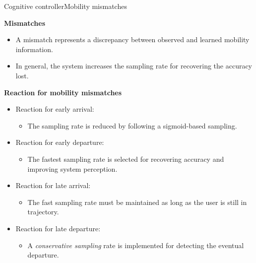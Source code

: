 \begin{frame}{Cognitive controller}{Mobility mismatches}
\small
\begin{block}{\small \textbf{Mismatches}}
  \begin{itemize}
    \item A mismatch represents a discrepancy between observed and learned mobility information.
    \item In general, the system increases the sampling rate for recovering the accuracy lost.
  \end{itemize}
\end{block}

\begin{block}{\small \textbf{Reaction for mobility mismatches}}
\begin{itemize}
  \item Reaction for early arrival:
  \begin{itemize}
    \item The sampling rate is reduced by following a sigmoid-based sampling.
  \end{itemize}

  \item Reaction for early departure:
  \begin{itemize}
    \item The fastest sampling rate is selected for recovering accuracy and improving system perception.
  \end{itemize}

  \item Reaction for late arrival:
  \begin{itemize}
    \item The fast sampling rate must be maintained as long as the user is still in trajectory.
  \end{itemize}

  \item Reaction for late departure:
  \begin{itemize}
    \item A \emph{conservative sampling} rate is implemented for detecting the eventual departure.
  \end{itemize}

\end{itemize}
\end{block}
\end{frame}
